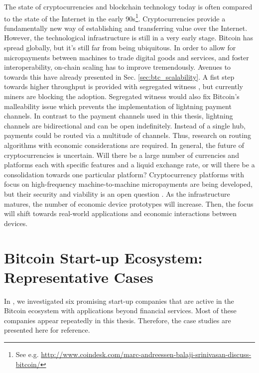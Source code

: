 The state of cryptocurrencies and blockchain technology today is often compared to the state of the Internet in the early 90s\footnote{See e.g. \url{http://www.coindesk.com/marc-andreessen-balaji-srinivasan-discuss-bitcoin/}}. Cryptocurrencies provide a fundamentally new way of establishing and transferring value over the Internet. However, the technological infrastructure is still in a very early stage. Bitcoin has spread globally, but it's still far from being ubiquitous. In order to allow for micropayments between machines to trade digital goods and services, and foster interoperability, on-chain scaling has to improve tremendously. Avenues to towards this have already presented in Sec. \ref{sec:btc_scalability}. A fist step towards higher throughput is provided with segregated witness \parencite{bip141}, but currently miners are blocking the adoption. Segregated witness would also fix Bitcoin's malleability issue which prevents the implementation of lightning payment channels. In contrast to the payment channels used in this thesis, lightning channels are bidirectional and can be open indefinitely. Instead of a single hub, payments could be routed via a multitude of channels. Thus, research on routing algorithms with economic considerations are required.
In general, the future of cryptocurrencies is uncertain. Will there be a large number of currencies and platforms each with specific features and a liquid exchange rate, or will there be a consolidation towards one particular platform? Cryptocurrency platforms with focus on high-frequency machine-to-machine micropayments are being developed, but their security and viability is an open question \parencite{tangle2016}.  As the infrastructure matures, the number of economic device prototypes will increase. Then, the focus will shift towards real-world applications and economic interactions between devices. 




\newpage
\appendix
\chapter{Bitcoin Start-up Ecosystem: Representative Cases}
\label{appendix:cases}

In \parencite{Worner2016ecis}, we investigated six promising start-up companies that are active in the Bitcoin ecosystem with applications beyond financial services. Most of these companies appear repeatedly in this thesis. Therefore, the case studies are presented here for reference.

